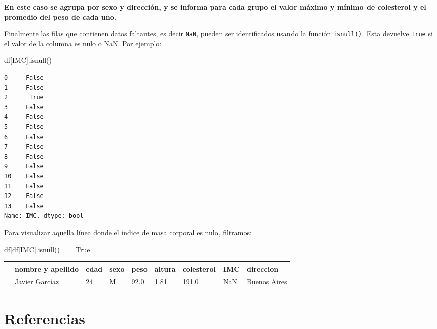 \documentclass[
  letterpaper,
  DIV=11,
  numbers=noendperiod]{scrreprt}
\newenvironment{Shaded}{\begin{snugshade}}{\end{snugshade}}
\newcommand{\NormalTok}[1]{\textcolor[rgb]{0.00,0.23,0.31}{#1}}
\newcommand{\OperatorTok}[1]{\textcolor[rgb]{0.37,0.37,0.37}{#1}}
\newcommand{\StringTok}[1]{\textcolor[rgb]{0.13,0.47,0.30}{#1}}
\newcommand{\VariableTok}[1]{\textcolor[rgb]{0.07,0.07,0.07}{#1}}
\begin{document}
\textbf{En este caso se agrupa por sexo y dirección, y se informa para
cada grupo el valor máximo y mínimo de colesterol y el promedio del peso
de cada uno.}

Finalmente las filas que contienen datos faltantes, es decir
\texttt{NaN}, pueden ser identificados usando la función
\texttt{isnull()}. Esta devuelve \texttt{True} si el valor de la columna
es nulo o NaN. Por ejemplo:

\begin{Shaded}
\begin{Highlighting}[]
\NormalTok{df[}\StringTok{\textquotesingle{}IMC\textquotesingle{}}\NormalTok{].isnull()}
\end{Highlighting}
\end{Shaded}

\begin{verbatim}
0     False
1     False
2      True
3     False
4     False
5     False
6     False
7     False
8     False
9     False
10    False
11    False
12    False
13    False
Name: IMC, dtype: bool
\end{verbatim}

Para visualizar aquella línea donde el índice de masa corporal es nulo,
filtramos:

\begin{Shaded}
\begin{Highlighting}[]
\NormalTok{df[df[}\StringTok{\textquotesingle{}IMC\textquotesingle{}}\NormalTok{].isnull() }\OperatorTok{==} \VariableTok{True}\NormalTok{]}
\end{Highlighting}
\end{Shaded}

\begin{longtable}[]{@{}lllllllll@{}}
\toprule\noalign{}
& nombre y apellido & edad & sexo & peso & altura & colesterol & IMC &
direccion \\
\midrule\noalign{}
\endhead
\bottomrule\noalign{}
\endlastfoot
2 & Javier Garcíaz & 24 & M & 92.0 & 1.81 & 191.0 & NaN & Buenos
Aires \\
\end{longtable}


\chapter*{Referencias}\label{referencias}

\end{document}
